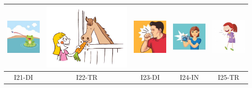 \documentclass[12pt,notitlepage]{article}
\begin{document}
\begin{center}
\begin{tabular}{|c||c||c||c||c|}
\includegraphics[width=0.16\columnwidth]{square/I16.jpg} & \includegraphics[width=0.16\columnwidth]{figures/I17.jpg} &  \includegraphics[width=0.16\columnwidth]{square/I18.jpg} &  \includegraphics[width=0.16\columnwidth]{square/I19.jpg} & \includegraphics[width=0.16\columnwidth]{square/I20.jpg} \\
\hline
\hline
I21-DI & I22-TR & I23-DI & I24-IN & I25-TR \\

\end{tabular}
\end{center}
\end{document}
